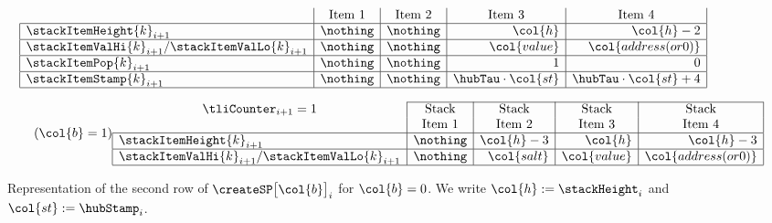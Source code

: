 \begin{figure}[h!]
\[\begin{array}{|l|c|c|r|r|}
	\multicolumn{1}{c|}{}                                   & \multicolumn{1}{c|}{\text{Item 1}} & \multicolumn{1}{c|}{\text{Item 2}} & \multicolumn{1}{c|}{\text{Item 3}} & \multicolumn{1}{c|}{\text{Item 4}} \\ \hline
	\stackItemHeight{k}_{i + 1}                             & \nothing                           & \nothing                           & \col{h}                            & \col{h} - 2                        \\ \hline
	\stackItemValHi{k}_{i + 1} / \stackItemValLo{k}_{i + 1} & \nothing                           & \nothing                           & \col{value}                        & \col{address (or 0)}               \\ \hline
	\stackItemPop{k}_{i + 1}                                & \nothing                           & \nothing                           & 1                                  & 0                                  \\ \hline
	\stackItemStamp{k}_{i + 1}                              & \nothing                           & \nothing                           & \hubTau \cdot \col{st}             & \hubTau \cdot \col{st} + 4         \\ \hline
	\end{array}
\]
\label{fig: create stack pattern}
\caption{%
Representation of the second row of $\createSP\big[\col{b}\big]_{i}$ for $\col{b} = 0$.
We write $\col{h} := \stackHeight_{i}$ and $\col{st} := \hubStamp_{i}$.}
\[
	\tag{$\col{b} = 1$}
	\begin{array}{|l|c|r|r|r|}
	\cline{2-5}
	\multicolumn{1}{c|}{\tliCounter_{i + 1} = 1}            & \multicolumn{1}{c|}{\text{Stack}}  & \multicolumn{1}{c|}{\text{Stack}}  & \multicolumn{1}{c|}{\text{Stack}}  & \multicolumn{1}{c|}{\text{Stack}}  \\
	\multicolumn{1}{c|}{}                                   & \multicolumn{1}{c|}{\text{Item 1}} & \multicolumn{1}{c|}{\text{Item 2}} & \multicolumn{1}{c|}{\text{Item 3}} & \multicolumn{1}{c|}{\text{Item 4}} \\ \hline
	\stackItemHeight{k}_{i + 1}                             & \nothing                           & \col{h} - 3                        & \col{h}                            & \col{h} - 3                        \\ \hline
	\stackItemValHi{k}_{i + 1} / \stackItemValLo{k}_{i + 1} & \nothing                           & \col{salt}                         & \col{value}                        & \col{address (or 0)}               \\ \hline

\end{array}\]
\end{figure}
